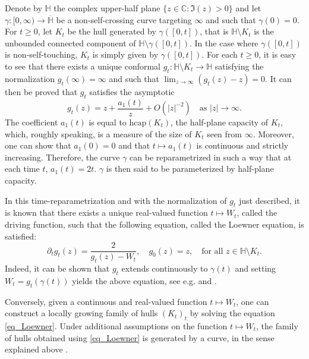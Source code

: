 \documentclass{article}
\newcommand{\HH}{{\mathbb{H}}}
\theoremstyle{definition}
\theoremstyle{remark}
\theoremstyle{remark}
\begin{document}
Denote by $\HH$ the complex upper-half plane $\{ z \in \mathbb{C}: \Im(z) > 0 \}$ and let $\gamma: [0,\infty) \to \overline{\mathbb{H}}$ be a non-self-crossing curve targeting $\infty$ and such that $\gamma(0)=0$. For $t \geq 0$, let $K_t$ be the hull generated by $\gamma([0,t])$, that is $\HH \setminus K_t$ is the unbounded connected component of $\HH \setminus \gamma([0,t])$. In the case where $\gamma([0,t])$ is non-self-touching, $K_t$ is simply given by $\gamma([0,t])$. For each $t \geq 0$, it is easy to see that there exists a unique conformal $g_t: \HH \setminus K_t \to \HH$ satisfying the normalization $g_t(\infty) = \infty$ and such that $\lim_{z \to \infty} (g_t(z) - z) = 0$. It can then be proved that $g_t$ satisfies the asymptotic
\begin{equation*}
    g_t(z) = z + \frac{a_1(t)}{z} + O(\vert z \vert^{-2}) \quad \text{as } \vert z \vert \to \infty.
\end{equation*}
The coefficient $a_1(t)$ is equal to $\text{hcap}(K_t)$, the half-plane capacity of $K_t$, which, roughly speaking, is a measure of the size of $K_t$ seen from $\infty$. Moreover, one can show that $a_1(0)=0$ and that $t \mapsto a_1(t)$ is continuous and strictly increasing. Therefore, the curve $\gamma$ can be reparametrized in such a way that at each time $t$, $a_1(t) = 2t$. $\gamma$ is then said to be parameterized by half-plane capacity.

In this time-reparametrization and with the normalization of $g_t$ just described, it is known that there exists a unique real-valued function $t \mapsto W_t$, called the driving function, such that the following equation, called the Loewner equation, is satisfied:
\begin{equation} \label{eq_Loewner}
    \partial_t g_t(z) = \frac{2}{g_t(z) - W_t},  \quad g_0(z)=z, \quad \text{for all $z \in \HH \setminus K_t$}.
\end{equation}
Indeed, it can be shown that $g_t$ extends continuously to $\gamma(t)$ and setting $W_t = g_t(\gamma(t))$ yields the above equation, see e.g. \cite[Chapter~4]{book_Lawler} and \cite[Chapter~4]{book_SLE}.

Conversely, given a continuous and real-valued function $t \mapsto W_t$, one can construct a locally growing family of hulls $(K_t)_t$ by solving the equation \eqref{eq_Loewner}. Under additional assumptions on the function $t \mapsto W_t$, the family of hulls obtained using \eqref{eq_Loewner} is generated by a curve, in the sense explained above \cite{slit_Loewner}.
\end{document}

